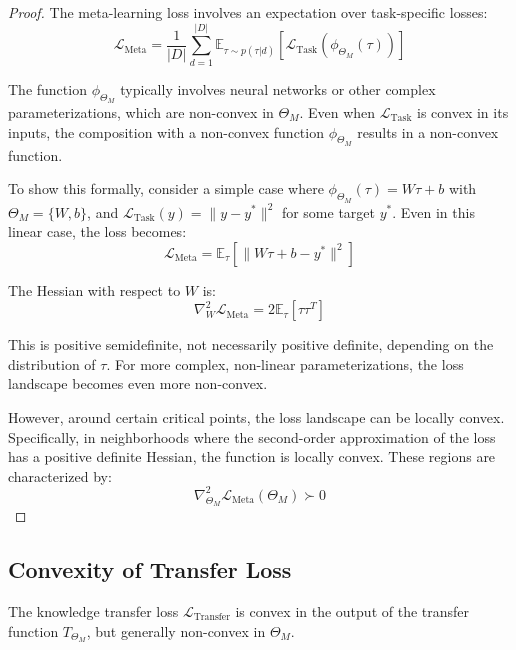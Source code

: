 \begin{proof}
The meta-learning loss involves an expectation over task-specific losses:
\begin{equation}
\mathcal{L}_{\text{Meta}} = \frac{1}{|D|}\sum_{d=1}^{|D|} \mathbb{E}_{\tau \sim p(\tau|d)}\left[ \mathcal{L}_{\text{Task}}(\phi_{\Theta_M}(\tau)) \right]
\end{equation}

The function $\phi_{\Theta_M}$ typically involves neural networks or other complex parameterizations, which are non-convex in $\Theta_M$. Even when $\mathcal{L}_{\text{Task}}$ is convex in its inputs, the composition with a non-convex function $\phi_{\Theta_M}$ results in a non-convex function.

To show this formally, consider a simple case where $\phi_{\Theta_M}(\tau) = W\tau + b$ with $\Theta_M = \{W, b\}$, and $\mathcal{L}_{\text{Task}}(y) = \|y - y^*\|^2$ for some target $y^*$. Even in this linear case, the loss becomes:
\begin{equation}
\mathcal{L}_{\text{Meta}} = \mathbb{E}_{\tau}\left[ \|W\tau + b - y^*\|^2 \right]
\end{equation}

The Hessian with respect to $W$ is:
\begin{equation}
\nabla_W^2 \mathcal{L}_{\text{Meta}} = 2\mathbb{E}_{\tau}[\tau\tau^T]
\end{equation}

This is positive semidefinite, not necessarily positive definite, depending on the distribution of $\tau$. For more complex, non-linear parameterizations, the loss landscape becomes even more non-convex.

However, around certain critical points, the loss landscape can be locally convex. Specifically, in neighborhoods where the second-order approximation of the loss has a positive definite Hessian, the function is locally convex. These regions are characterized by:
\begin{equation}
\nabla^2_{\Theta_M} \mathcal{L}_{\text{Meta}}(\Theta_M) \succ 0
\end{equation}
\end{proof}

\subsection{Convexity of Transfer Loss}

\begin{theorem}
The knowledge transfer loss $\mathcal{L}_{\text{Transfer}}$ is convex in the output of the transfer function $T_{\Theta_M}$, but generally non-convex in $\Theta_M$.
\end{theorem}

